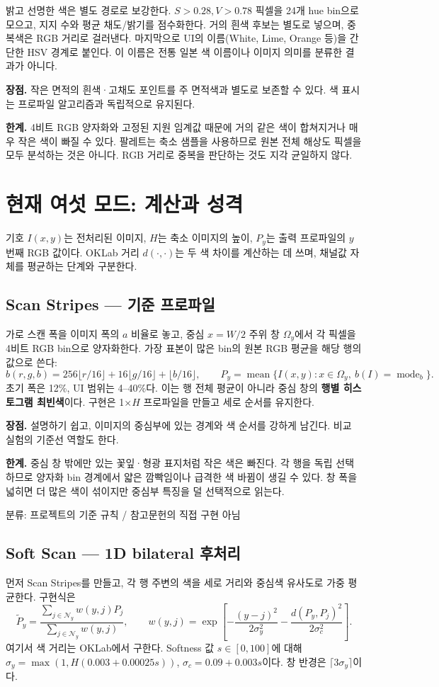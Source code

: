 \documentclass[10pt]{article}
\newcommand{\tagline}[1]{\textcolor{moss}{\small\textsf{#1}}}
\newcommand{\good}{\textbf{장점.} }
\newcommand{\trade}{\textbf{한계.} }
\begin{document}
밝고 선명한 색은 별도 경로로 보강한다. $S>0.28,V>0.78$ 픽셀을 24개 hue bin으로 모으고, 지지 수와 평균 채도/밝기를 점수화한다. 거의 흰색 후보는 별도로 넣으며, 중복색은 RGB 거리로 걸러낸다. 마지막으로 UI의 이름(White, Lime, Orange 등)을 간단한 HSV 경계로 붙인다. 이 이름은 전통 일본 색 이름이나 이미지 의미를 분류한 결과가 아니다.

\good 작은 면적의 흰색·고채도 포인트를 주 면적색과 별도로 보존할 수 있다. 색 표시는 프로파일 알고리즘과 독립적으로 유지된다.

\trade 4비트 RGB 양자화와 고정된 지원 임계값 때문에 거의 같은 색이 합쳐지거나 매우 작은 색이 빠질 수 있다. 팔레트는 축소 샘플을 사용하므로 원본 전체 해상도 픽셀을 모두 분석하는 것은 아니다. RGB 거리로 중복을 판단하는 것도 지각 균일하지 않다.

\section{현재 여섯 모드: 계산과 성격}
기호 $I(x,y)$는 전처리된 이미지, $H$는 축소 이미지의 높이, $P_y$는 출력 프로파일의 $y$번째 RGB 값이다. OKLab 거리 $d(\cdot,\cdot)$는 두 색 차이를 계산하는 데 쓰며, 채널값 자체를 평균하는 단계와 구분한다.

\subsection{Scan Stripes --- 기준 프로파일}
가로 스캔 폭을 이미지 폭의 $a$ 비율로 놓고, 중심 $x=W/2$ 주위 창 $\Omega_y$에서 각 픽셀을 4비트 RGB bin으로 양자화한다. 가장 표본이 많은 bin의 원본 RGB 평균을 해당 행의 값으로 쓴다:
\[
b(r,g,b)=256\lfloor r/16\rfloor+16\lfloor g/16\rfloor+\lfloor b/16\rfloor,\qquad
P_y=\operatorname{mean}\{I(x,y):x\in\Omega_y,\ b(I)=\operatorname{mode}_b\}.
\]
초기 폭은 12\%, UI 범위는 4--40\%다. 이는 행 전체 평균이 아니라 중심 창의 \textbf{행별 히스토그램 최빈색}이다. 구현은 1$\times H$ 프로파일을 만들고 세로 순서를 유지한다.

\good 설명하기 쉽고, 이미지의 중심부에 있는 경계와 색 순서를 강하게 남긴다. 비교 실험의 기준선 역할도 한다.

\trade 중심 창 밖에만 있는 꽃잎·형광 표지처럼 작은 색은 빠진다. 각 행을 독립 선택하므로 양자화 bin 경계에서 얇은 깜빡임이나 급격한 색 바뀜이 생길 수 있다. 창 폭을 넓히면 더 많은 색이 섞이지만 중심부 특징을 덜 선택적으로 읽는다.

\tagline{분류: 프로젝트의 기준 규칙 / 참고문헌의 직접 구현 아님}

\subsection{Soft Scan --- 1D bilateral 후처리}
먼저 Scan Stripes를 만들고, 각 행 주변의 색을 세로 거리와 중심색 유사도로 가중 평균한다. 구현식은
\[
\widetilde P_y=\frac{\sum_{j\in\mathcal N_y} w(y,j)P_j}{\sum_{j\in\mathcal N_y}w(y,j)},\qquad
w(y,j)=\exp\left[-\frac{(y-j)^2}{2\sigma_y^2}-\frac{d(P_y,P_j)^2}{2\sigma_c^2}\right].
\]
여기서 색 거리는 OKLab에서 구한다. Softness 값 $s\in[0,100]$에 대해 $\sigma_y=\max(1,H(0.003+0.00025s))$, $\sigma_c=0.09+0.003s$이다. 창 반경은 $\lceil3\sigma_y\rceil$이다.
\end{document}

